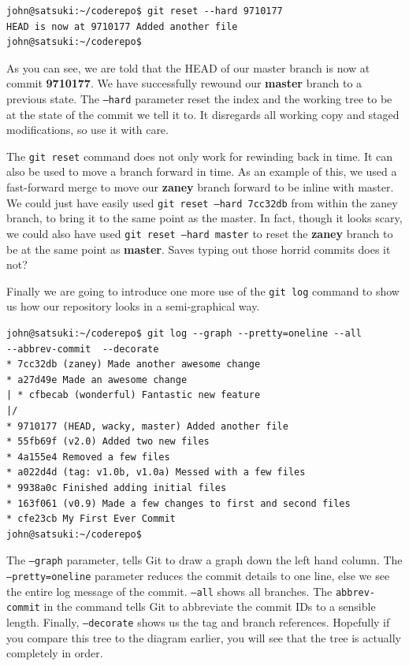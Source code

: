 \begin{Verbatim}
john@satsuki:~/coderepo$ git reset --hard 9710177
HEAD is now at 9710177 Added another file
john@satsuki:~/coderepo$
\end{Verbatim}

As you can see, we are told that the HEAD of our master branch is now at commit \textbf{9710177}.
We have successfully rewound our \textbf{master} branch to a previous state.
The \texttt{--hard} parameter reset the index and the working tree to be at the state of the commit we tell it to.
It disregards all working copy and staged modifications, so use it with care.

The \texttt{git reset} command does not only work for rewinding back in time.
It can also be used to move a branch forward in time.
As an example of this, we used a fast-forward merge to move our \textbf{zaney} branch forward to be inline with master.
We could just have easily used \texttt{git reset --hard 7cc32db} from within the zaney branch, to bring it to the same point as the master.
In fact, though it looks scary, we could also have used \texttt{git reset --hard master} to reset the \textbf{zaney} branch to be at the same point as \textbf{master}.
Saves typing out those horrid commits does it not?

Finally we are going to introduce one more use of the \texttt{git log} command to show us how our repository looks in a semi-graphical way.

\begin{Verbatim}
john@satsuki:~/coderepo$ git log --graph --pretty=oneline --all
--abbrev-commit  --decorate
* 7cc32db (zaney) Made another awesome change
* a27d49e Made an awesome change
| * cfbecab (wonderful) Fantastic new feature
|/
* 9710177 (HEAD, wacky, master) Added another file
* 55fb69f (v2.0) Added two new files
* 4a155e4 Removed a few files
* a022d4d (tag: v1.0b, v1.0a) Messed with a few files
* 9938a0c Finished adding initial files
* 163f061 (v0.9) Made a few changes to first and second files
* cfe23cb My First Ever Commit
john@satsuki:~/coderepo$

\end{Verbatim}

The \texttt{--graph} parameter, tells Git to draw a graph down the left hand column.
The \texttt{--pretty=oneline} parameter reduces the commit details to one line, else we see the entire log message of the commit.
\texttt{--all} shows all branches.
The \texttt{abbrev-commit} in the command tells Git to abbreviate the commit IDs to a sensible length.
Finally, \texttt{--decorate} shows us the tag and branch references.
Hopefully if you compare this tree to the diagram earlier, you will see that the tree is actually completely in order.

